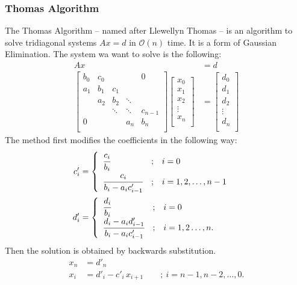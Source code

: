 \documentclass[a4paper]{article}
\begin{document}
\subsubsection{Thomas Algorithm}
The Thomas Algorithm -- named after Llewellyn Thomas -- is an algorithm to solve tridiagonal systems $Ax = d$ in $\mathcal O(n)$ time.
It is a form of Gaussian Elimination.
The system wa want to solve is the following:
\begin{align}
	Ax &= d \\
\begin{bmatrix}
   {b_0} & {c_0} & {   } & {   } & { 0 } \\
   {a_1} & {b_1} & {c_1} & {   } & {   } \\
   {   } & {a_2} & {b_2} & \ddots & {   } \\
   {   } & {   } & \ddots & \ddots & {c_{n-1}}\\
   { 0 } & {   } & {   } & {a_n} & {b_n}\\
\end{bmatrix}
\begin{bmatrix}
   {x_0 }  \\
   {x_1 }  \\
   {x_2 }  \\
   \vdots   \\
   {x_n }  \\
\end{bmatrix}
&=
\begin{bmatrix}
   {d_0 }  \\
   {d_1 }  \\
   {d_2 }  \\
   \vdots   \\
   {d_n }  \\
\end{bmatrix}
\end{align}
The method first modifies the coefficients in the following way:
\begin{align}
	c'_i &=
\begin{cases}
\begin{array}{lcl}
  \cfrac{c_i}{b_i}                  & ; & i = 0 \\
  \cfrac{c_i}{b_i - a_i c'_{i - 1}} & ; & i = 1, 2, \dots, n-1 \\
\end{array}
\end{cases} \\
d'_i &=
\begin{cases}
\begin{array}{lcl}
  \cfrac{d_i}{b_i}                  & ; & i = 0 \\
  \cfrac{d_i - a_i d'_{i - 1}}{b_i - a_i c'_{i - 1}} & ; & i = 1, 2 \dots, n. \\
\end{array}
\end{cases}
\end{align}
Then the solution is obtained by backwards substitution.
\begin{align}
	x_n &= d'_n \\
	x_i &= d'_i - c'_i\, x_{i + 1} \qquad ; \ i = n - 1, n - 2, \ldots, 0.
\end{align}
\end{document}
